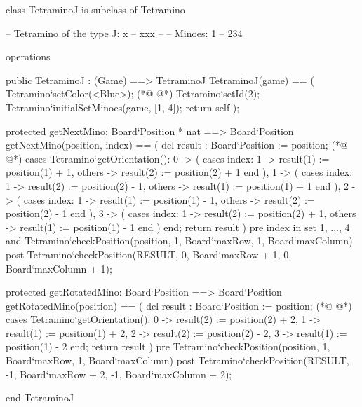 \begin{vdmpp}[breaklines=true]
class TetraminoJ is subclass of Tetramino
  
 -- Tetramino of the type J: x
 --       xxx
 -- 
 -- Minoes:       1
 --        234

 
 operations
 
  public TetraminoJ : (Game) ==> TetraminoJ
  TetraminoJ(game) == (
   Tetramino`setColor(<Blue>);
(*@
\label{TetraminoJ:15}
@*)
   Tetramino`setId(2);
   Tetramino`initialSetMinoes(game, [1, 4]);
   return self
  );

  protected getNextMino: Board`Position * nat ==> Board`Position
  getNextMino(position, index) == (
   dcl result : Board`Position := position;
(*@
\label{getNextMino:23}
@*)
   cases Tetramino`getOrientation():
    0 -> (
     cases index:
      1 -> result(1) := position(1) + 1,
      others -> result(2) := position(2) + 1
     end
    ),
    1 -> (
     cases index:
      1 -> result(2) := position(2) - 1,
      others -> result(1) := position(1) + 1
     end
    ),
    2 -> (
     cases index:
      1 -> result(1) := position(1) - 1,
      others -> result(2) := position(2) - 1
     end
    ),
    3 -> (
     cases index:
      1 -> result(2) := position(2) + 1,
      others -> result(1) := position(1) - 1
     end
    )
   end;
   return result
  )
  pre index in set {1, ..., 4} 
   and Tetramino`checkPosition(position, 1, Board`maxRow, 1, Board`maxColumn)
  post Tetramino`checkPosition(RESULT, 0, Board`maxRow + 1, 0, Board`maxColumn + 1);

  protected getRotatedMino: Board`Position ==> Board`Position
  getRotatedMino(position) == (
   dcl result : Board`Position := position;
(*@
\label{getRotatedMino:58}
@*)
   cases Tetramino`getOrientation():
    0 -> result(2) := position(2) + 2,
    1 -> result(1) := position(1) + 2,
    2 -> result(2) := position(2) - 2,
    3 -> result(1) := position(1) - 2
   end;
   return result
  )
  pre Tetramino`checkPosition(position, 1, Board`maxRow, 1, Board`maxColumn)
  post Tetramino`checkPosition(RESULT, -1, Board`maxRow + 2, -1, Board`maxColumn + 2);

end TetraminoJ
\end{vdmpp}
